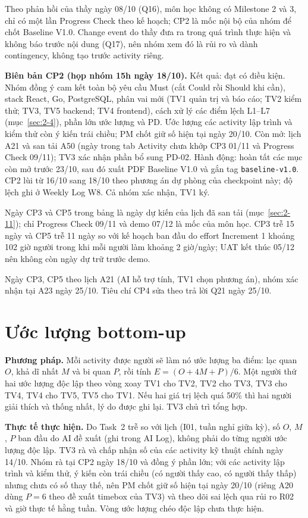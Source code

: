 Theo phản hồi của thầy ngày 08/10 (Q16), môn học không có Milestone 2 và 3, chỉ có một lần Progress Check theo kế hoạch; CP2 là mốc nội bộ của nhóm để chốt Baseline V1.0. Change event do thầy đưa ra trong quá trình thực hiện và không báo trước nội dung (Q17), nên nhóm xem đó là rủi ro và dành contingency, không tạo trước activity riêng.

\textbf{Biên bản CP2 (họp nhóm 15h ngày 18/10).} Kết quả: đạt có điều kiện. Nhóm đồng ý cam kết toàn bộ yêu cầu Must (cắt Could rồi Should khi cần), stack React, Go, PostgreSQL, phân vai mới (TV1 quản trị và báo cáo; TV2 kiểm thử; TV3, TV5 backend; TV4 frontend), cách xử lý các điểm lệch L1--L7 (mục~\ref{sec:2-4}), phần lớn ước lượng và PD. Ước lượng các activity lập trình và kiểm thử còn ý kiến trái chiều; PM chốt giữ số hiện tại ngày 20/10. Còn mở: lịch A21 và san tải A50 (ngày trong tab Activity chưa khớp CP3 01/11 và Progress Check 09/11); TV3 xác nhận phần bổ sung PD-02. Hành động: hoàn tất các mục còn mở trước 23/10, sau đó xuất PDF Baseline V1.0 và gắn tag \texttt{baseline-v1.0}. CP2 lùi từ 16/10 sang 18/10 theo phương án dự phòng của checkpoint này; độ lệch ghi ở Weekly Log W8. Cả nhóm xác nhận, TV1 ký.

Ngày CP3 và CP5 trong bảng là ngày dự kiến của lịch đã san tải (mục~\ref{sec:2-11}); chỉ Progress Check 09/11 và demo 07/12 là mốc của môn học. CP3 trễ 15 ngày và CP5 trễ 11 ngày so với kế hoạch ban đầu do effort Increment 1 khoảng 102 giờ người trong khi mỗi người làm khoảng 2 giờ/ngày; UAT kết thúc 05/12 nên không còn ngày dự trữ trước demo.

Ngày CP3, CP5 theo lịch A21 (AI hỗ trợ tính, TV1 chọn phương án), nhóm xác nhận tại A23 ngày 25/10. Tiêu chí CP4 sửa theo trả lời Q21 ngày 25/10.

\section{Ước lượng bottom-up}
\label{sec:2-6}
\textbf{Phương pháp.} Mỗi activity được người sẽ làm nó ước lượng ba điểm: lạc quan $O$, khả dĩ nhất $M$ và bi quan $P$, rồi tính $E = (O + 4M + P)/6$. Một người thứ hai ước lượng độc lập theo vòng xoay TV1 cho TV2, TV2 cho TV3, TV3 cho TV4, TV4 cho TV5, TV5 cho TV1. Nếu hai giá trị lệch quá 50\% thì hai người giải thích và thống nhất, lý do được ghi lại. TV3 chủ trì tổng hợp.

\textbf{Thực tế thực hiện.} Do Task~2 trễ so với lịch (I01, tuần nghỉ giữa kỳ), số $O$, $M$, $P$ ban đầu do AI đề xuất (ghi trong AI Log), không phải do từng người ước lượng độc lập. TV3 rà và chấp nhận số của các activity kỹ thuật chính ngày 14/10. Nhóm rà tại CP2 ngày 18/10 và đồng ý phần lớn; với các activity lập trình và kiểm thử, ý kiến còn trái chiều (có người thấy cao, có người thấy thấp) nhưng chưa có số thay thế, nên PM chốt giữ số hiện tại ngày 20/10 (riêng A20 dùng $P = 6$ theo đề xuất timebox của TV3) và theo dõi sai lệch qua rủi ro R02 và giờ thực tế hằng tuần. Vòng ước lượng chéo độc lập chưa thực hiện.


